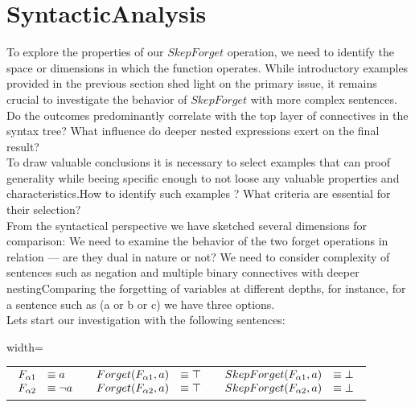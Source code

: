 \section{SyntacticAnalysis}
To explore the properties of our $SkepForget$ operation, we need to identify the space or dimensions in which the function operates. While introductory examples provided in the previous section shed light on the primary issue, it remains crucial to investigate the behavior of $SkepForget$ with more complex sentences. Do the outcomes predominantly correlate with the top layer of connectives in the syntax tree? What influence do deeper nested expressions exert on the final result?\\To draw valuable conclusions it is necessary to select examples that can proof generality while beeing specific enough to not loose any valuable properties and characteristics.How to identify such examples ? What criteria are essential for their selection?\\From the syntactical perspective we have sketched several dimensions for comparison: We need to examine the behavior of the two forget operations in relation — are they dual in nature or not? We need to consider complexity of sentences such as negation and multiple binary connectives with deeper nestingComparing the forgetting of variables at different depths, for instance, for a sentence such as (a or b or c) we have three options.\\Lets start our investigation with the following sentences:\\\begin{adjustbox}{width=\textwidth}
\begin{tabular}{| c | c | c |}
 &  &  \\
\hline
$\begin{array}{l l}
F_{\alpha1} &\equiv a\\
F_{\alpha2} &\equiv \lnot a\\
\end{array}$ & $\begin{array}{l l}
Forget(F_{\alpha1},a) &\equiv \top\\
Forget(F_{\alpha2},a) &\equiv \top\\
\end{array}$ & $\begin{array}{l l}
SkepForget(F_{\alpha1},a) &\equiv \bot\\
SkepForget(F_{\alpha2},a) &\equiv \bot\\
\end{array}$\\
\end{tabular}\
\end{adjustbox}\newline\newline
